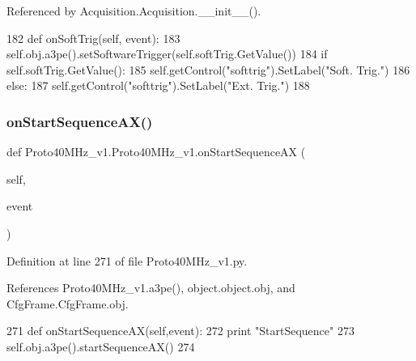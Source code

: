 Referenced by Acquisition.\+Acquisition.\+\_\+\+\_\+init\+\_\+\+\_\+().


\begin{DoxyCode}
182     \textcolor{keyword}{def }onSoftTrig(self, event):
183         self.obj.a3pe().setSoftwareTrigger(self.softTrig.GetValue())
184         \textcolor{keywordflow}{if} self.softTrig.GetValue():
185             self.getControl(\textcolor{stringliteral}{"softtrig"}).SetLabel(\textcolor{stringliteral}{"Soft. Trig."})
186         \textcolor{keywordflow}{else}:
187             self.getControl(\textcolor{stringliteral}{"softtrig"}).SetLabel(\textcolor{stringliteral}{"Ext. Trig."})
188             
\end{DoxyCode}
\mbox{\label{classProto40MHz__v1_1_1Proto40MHz__v1_a9311a8d74fcc534437715e3ce1bb5dfb}} 
\subsubsection{\texorpdfstring{on\+Start\+Sequence\+A\+X()}{onStartSequenceAX()}}
{\footnotesize\ttfamily def Proto40\+M\+Hz\+\_\+v1.\+Proto40\+M\+Hz\+\_\+v1.\+on\+Start\+Sequence\+AX (\begin{DoxyParamCaption}\item[{}]{self,  }\item[{}]{event }\end{DoxyParamCaption})}



Definition at line 271 of file Proto40\+M\+Hz\+\_\+v1.\+py.



References Proto40\+M\+Hz\+\_\+v1.\+a3pe(), object.\+object.\+obj, and Cfg\+Frame.\+Cfg\+Frame.\+obj.


\begin{DoxyCode}
271     \textcolor{keyword}{def }onStartSequenceAX(self,event):
272         \textcolor{keywordflow}{print} \textcolor{stringliteral}{"StartSequence"}
273         self.obj.a3pe().startSequenceAX()
274         
\end{DoxyCode}
\mbox{\label{classProto40MHz__v1_1_1Proto40MHz__v1_a290d939bc88adbfc9dd6d3044b88aa80}} 
